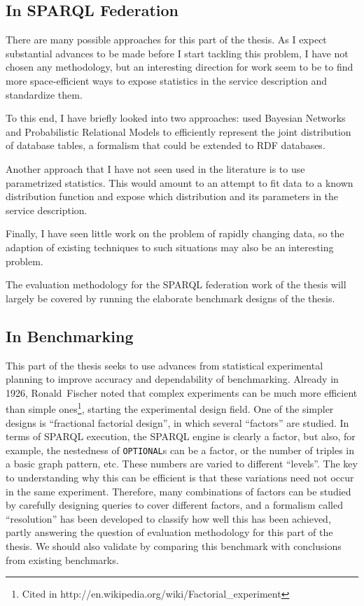 \documentclass{llncs}
\begin{document}
\subsection{In SPARQL Federation}

There are many possible approaches for this part of the thesis. As I
expect substantial advances to be made before I start tackling this
problem, I have not chosen any methodology, but an interesting
direction for work seem to be to find more space-efficient ways to
expose statistics in the service description and standardize them.

To this end, I have briefly looked into two approaches:
\cite{Getoor:2001:SEU:375663.375727} used Bayesian Networks and
Probabilistic Relational Models to efficiently represent the joint
distribution of database tables, a formalism that could be extended to
RDF databases.

Another approach that I have not seen used in the literature is to use
parametrized statistics. This would amount to an attempt to fit data to
a known distribution function and expose which distribution and its
parameters in the service description.

Finally, I have seen little work on the problem of rapidly changing
data, so the adaption of existing techniques to such situations may
also be an interesting problem.

The evaluation methodology for the SPARQL federation work of the
thesis will largely be covered by running the elaborate benchmark
designs of the thesis.

\subsection{In Benchmarking}\label{sec:benchmethod}

This part of the thesis seeks to use advances from statistical
experimental planning to improve accuracy and dependability of
benchmarking. Already in 1926, Ronald~Fischer noted that complex
experiments can be much more efficient than simple ones\footnote{Cited
  in http://en.wikipedia.org/wiki/Factorial\_experiment}, starting the
experimental design field. One of the simpler designs is ``fractional
factorial design'', in which several ``factors'' are studied. In terms
of SPARQL execution, the SPARQL engine is clearly a factor, but also,
for example, the nestedness of \texttt{OPTIONAL}s can be a factor, or
the number of triples in a basic graph pattern, etc. These numbers are
varied to different ``levels''. The key to understanding why this can
be efficient is that these variations need not occur in the same
experiment. Therefore, many combinations of factors can be studied by
carefully designing queries to cover different factors, and a
formalism called ``resolution'' has been developed to classify how
well this has been achieved, partly answering the question of
evaluation methodology for this part of the thesis. We should also
validate by comparing this benchmark with conclusions from existing
benchmarks.
\end{document}
